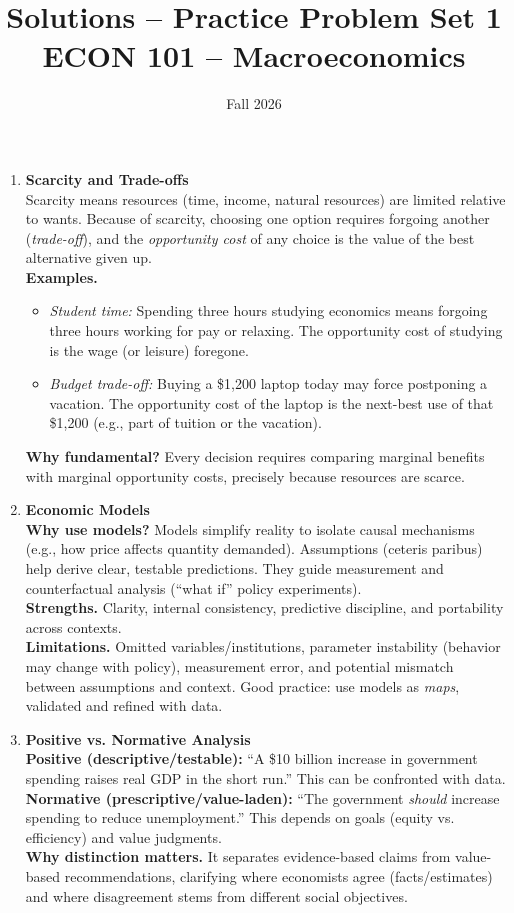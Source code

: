 \documentclass[12pt]{article}
\title{Solutions -- Practice Problem Set 1\\ \vspace{15pt} \large ECON 101 -- Macroeconomics}
\author{}
\date{Fall 2026}
\begin{document}
\maketitle


\begin{enumerate}
\item \textbf{Scarcity and Trade-offs} \\
Scarcity means resources (time, income, natural resources) are limited relative to wants. Because of scarcity, choosing one option requires forgoing another (\emph{trade-off}), and the \emph{opportunity cost} of any choice is the value of the best alternative given up. \\
\textbf{Examples.}
\begin{itemize}
  \item \emph{Student time:} Spending three hours studying economics means forgoing three hours working for pay or relaxing. The opportunity cost of studying is the wage (or leisure) foregone.
  \item \emph{Budget trade-off:} Buying a \$1{,}200 laptop today may force postponing a vacation. The opportunity cost of the laptop is the next-best use of that \$1{,}200 (e.g., part of tuition or the vacation).
\end{itemize}
\textbf{Why fundamental?} Every decision requires comparing marginal benefits with marginal opportunity costs, precisely because resources are scarce.

\item \textbf{Economic Models} \\
\textbf{Why use models?} Models simplify reality to isolate causal mechanisms (e.g., how price affects quantity demanded). Assumptions (ceteris paribus) help derive clear, testable predictions. They guide measurement and counterfactual analysis (``what if'' policy experiments). \\
\textbf{Strengths.} Clarity, internal consistency, predictive discipline, and portability across contexts. \\
\textbf{Limitations.} Omitted variables/institutions, parameter instability (behavior may change with policy), measurement error, and potential mismatch between assumptions and context. Good practice: use models as \emph{maps}, validated and refined with data.

\item \textbf{Positive vs. Normative Analysis} \\
\textbf{Positive (descriptive/testable):} ``A \$10 billion increase in government spending raises real GDP in the short run.'' This can be confronted with data. \\
\textbf{Normative (prescriptive/value-laden):} ``The government \emph{should} increase spending to reduce unemployment.'' This depends on goals (equity vs. efficiency) and value judgments. \\
\textbf{Why distinction matters.} It separates evidence-based claims from value-based recommendations, clarifying where economists agree (facts/estimates) and where disagreement stems from different social objectives.


\end{enumerate}
\end{document}
